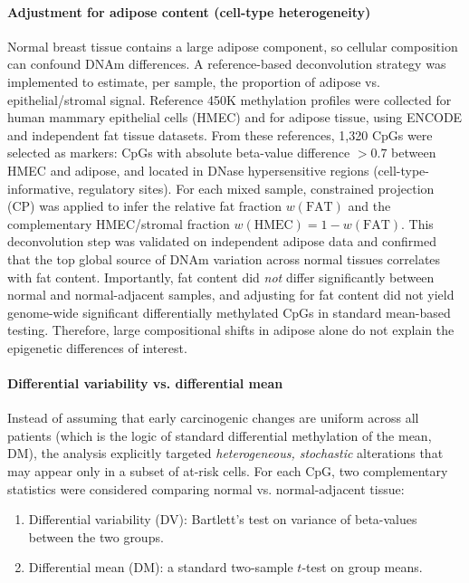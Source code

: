 \documentclass[10pt]{extarticle}
\begin{document}
\paragraph{Adjustment for adipose content (cell-type heterogeneity)}
Normal breast tissue contains a large adipose component, so cellular composition can confound DNAm differences. A reference-based deconvolution strategy was implemented to estimate, per sample, the proportion of adipose vs. epithelial/stromal signal. Reference 450K methylation profiles were collected for human mammary epithelial cells (HMEC) and for adipose tissue, using ENCODE and independent fat tissue datasets. From these references, 1{,}320 CpGs were selected as markers: CpGs with absolute beta-value difference $>0.7$ between HMEC and adipose, and located in DNase hypersensitive regions (cell-type-informative, regulatory sites). For each mixed sample, constrained projection (CP) was applied to infer the relative fat fraction $w(\text{FAT})$ and the complementary HMEC/stromal fraction $w(\text{HMEC}) = 1 - w(\text{FAT})$. This deconvolution step was validated on independent adipose data and confirmed that the top global source of DNAm variation across normal tissues correlates with fat content. Importantly, fat content did \textit{not} differ significantly between normal and normal-adjacent samples, and adjusting for fat content did not yield genome-wide significant differentially methylated CpGs in standard mean-based testing. Therefore, large compositional shifts in adipose alone do not explain the epigenetic differences of interest.

\paragraph{Differential variability vs. differential mean}
Instead of assuming that early carcinogenic changes are uniform across all patients (which is the logic of standard differential methylation of the mean, DM), the analysis explicitly targeted \textit{heterogeneous, stochastic} alterations that may appear only in a subset of at-risk cells. For each CpG, two complementary statistics were considered comparing normal vs. normal-adjacent tissue: 
\begin{enumerate}
  \item Differential variability (DV): Bartlett’s test on variance of beta-values between the two groups.
  \item Differential mean (DM): a standard two-sample $t$-test on group means.
\end{enumerate}
\end{document}
